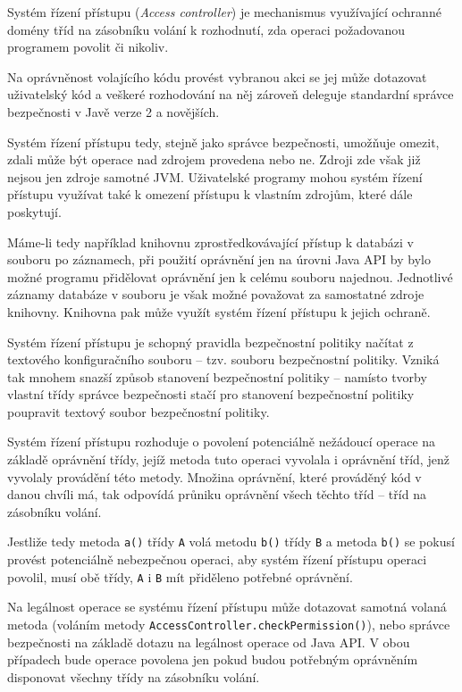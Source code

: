 Systém řízení přístupu ({\it Access controller}) je mechanismus využívající ochranné domény tříd na zásobníku volání k rozhodnutí, zda operaci požadovanou programem povolit či nikoliv.

Na oprávněnost volajícího kódu provést vybranou akci se jej může dotazovat uživatelský kód a veškeré rozhodování na něj zároveň deleguje standardní správce bezpečnosti v Javě verze 2 a novějších. \cite[5]{oaks}

Systém řízení přístupu tedy, stejně jako správce bezpečnosti, umožňuje omezit, zdali může být operace nad zdrojem provedena nebo ne. Zdroji zde však již nejsou jen zdroje samotné JVM. Uživatelské programy mohou systém řízení přístupu využívat také k omezení přístupu k vlastním zdrojům, které dále poskytují. \cite[5]{oaks}

Máme-li tedy například knihovnu zprostředkovávající přístup k databázi v souboru po záznamech, při použití oprávnění jen na úrovni Java API by bylo možné programu přidělovat oprávnění jen k celému souboru najednou. Jednotlivé záznamy databáze v souboru je však možné považovat za samostatné zdroje knihovny. Knihovna pak může využít systém řízení přístupu k jejich ochraně.

Systém řízení přístupu je schopný pravidla bezpečnostní politiky načítat z textového konfiguračního souboru -- tzv. souboru bezpečnostní politiky. Vzniká tak mnohem snazší způsob stanovení bezpečnostní politiky -- namísto tvorby vlastní třídy správce bezpečnosti stačí pro stanovení bezpečnostní politiky poupravit textový soubor bezpečnostní politiky. \cite[5]{oaks}

Systém řízení přístupu rozhoduje o povolení potenciálně nežádoucí operace na základě oprávnění třídy, jejíž metoda tuto operaci vyvolala i oprávnění tříd,
jenž vyvolaly provádění této metody.
Množina oprávnění, které prováděný kód v danou chvíli má, tak odpovídá průniku oprávnění všech těchto tříd -- tříd na zásobníku volání.

Jestliže tedy metoda {\tt a()} třídy {\tt A} volá metodu {\tt b()} třídy {\tt B} a metoda {\tt b()} se pokusí provést potenciálně nebezpečnou operaci,
aby systém řízení přístupu operaci povolil, musí obě třídy, {\tt A} i {\tt B} mít přiděleno potřebné oprávnění.

Na legálnost operace se systému řízení přístupu může dotazovat samotná volaná metoda (voláním metody {\tt AccessController.checkPermission()}), nebo správce bezpečnosti na základě dotazu na legálnost operace od Java API. V obou případech bude operace povolena jen pokud budou potřebným oprávněním disponovat všechny třídy na zásobníku volání.

